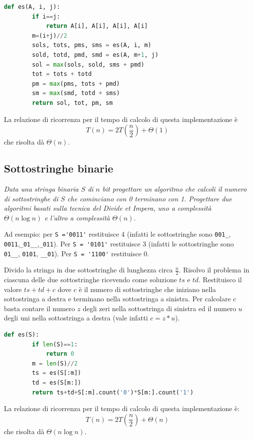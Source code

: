 \begin{lstlisting}[language=Python]
    def es(A, i, j):
        if i==j:
            return A[i], A[i], A[i], A[i]
        m=(i+j)//2
        sols, tots, pms, sms = es(A, i, m)
        sold, totd, pmd, smd = es(A, m+1, j)
        sol = max(sols, sold, sms + pmd)
        tot = tots + totd
        pm = max(pms, tots + pmd) 
        sm = max(smd, totd + sms)
        return sol, tot, pm, sm
\end{lstlisting}
La relazione di ricorrenza per il tempo di calcolo di questa implementazione è
\begin{equation*}
    T(n) = 2T\left(\frac{n}{2}\right) +\Theta(1)
\end{equation*}
che risolta dà $\Theta(n)$.

\subsection{Sottostringhe binarie}
\textit{Data una stringa binaria $S$ di $n$ bit progettare un algoritmo che calcoli il numero di sottostringhe di $S$ che cominciano con 0 terminano con 1. Progettare due algoritmi basati sulla tecnica del Divide et Impera, uno a complessità $\Theta(n\log n)$ e l'altro a complessità $\Theta(n)$.}

Ad esempio: per \verb|S ='0011'| restituisce 4 (infatti le sottostringhe sono \verb|001_|, \verb|0011|,\verb|_01__|,\verb|_011|). Per \verb|S = '0101'| restituisce 3 (infatti le sottostringhe sono \verb|01__|, \verb|0101|, \verb|__01|). Per \verb|S = '1100'| restituisce 0.

Divido la stringa in due sottostringhe di lunghezza circa $\frac{n}{2}$. Risolvo il problema in ciascuna delle due sottostringhe ricevendo come soluzione $ts$ e $td$. Restituisco il valore $ts+td+c$ dove $c$ è il numero di sottostringhe che iniziano nella sottostringa a destra e terminano nella sottostringa a sinistra. Per calcolare $c$ basta contare il numero $z$ degli zeri nella sottostringa di sinistra ed il numero $u$ degli uni nella sottostringa a destra (vale infatti $c=z*u$).

\begin{lstlisting}[language=Python]
    def es(S):
        if len(S)==1:
            return 0
        m = len(S)//2
        ts = es(S[:m])
        td = es(S[m:])
        return ts+td+S[:m].count('0')*S[m:].count('1')   
\end{lstlisting}
La relazione di ricorrenza per il tempo di calcolo di questa implementazione è:
\begin{equation*}
    T(n) = 2T\left(\frac{n}{2}\right) + \Theta(n)
\end{equation*}
che risolta dà $\Theta(n\log n)$.

